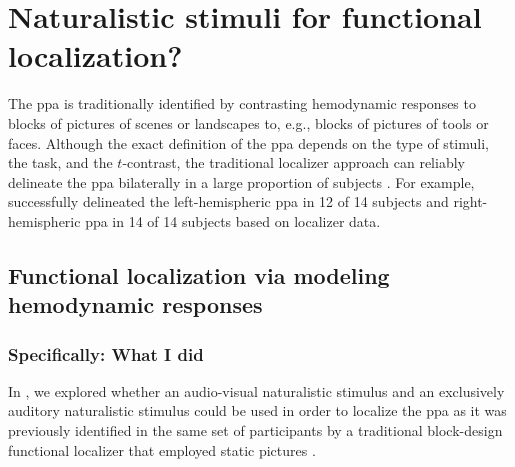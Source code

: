




\pagebreak

\section{Naturalistic stimuli for functional localization?}



%
The \ac{ppa} is traditionally identified by contrasting hemodynamic responses to
blocks of pictures of scenes or landscapes to, e.g., blocks of pictures of tools
or faces.
%
Although the exact definition of the \ac{ppa} depends on the type of stimuli,
the task, and the $t$-contrast, the traditional localizer approach can reliably
delineate the \ac{ppa} bilaterally in a large proportion of subjects
\citep{zhen2017quantifying}.
%
For example, \citet{sengupta2016extension} successfully delineated the
left-hemispheric \ac{ppa} in 12 of 14 subjects and right-hemispheric \ac{ppa} in
14 of 14 subjects based on localizer data.


\subsection{Functional localization via modeling hemodynamic responses}


\subsubsection{Specifically: What I did}

In \citet{haeusler2022processing}, we explored whether an audio-visual
naturalistic stimulus and an exclusively auditory naturalistic stimulus could be
used in order to localize the \ac{ppa} as it was previously identified in the
same set of participants by a traditional block-design functional localizer that
employed static pictures \citep{sengupta2016extension}.


